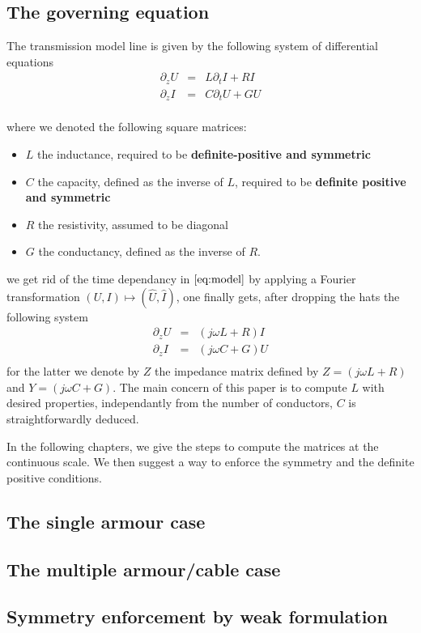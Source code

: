 \subsection*{The governing equation}
The transmission model line is given by the following system of differential equations
\begin{equation}
  \label{eq:model}
    \begin{array}{ccc}
      \partial_z U&=& L\partial_t I + RI \\
      \partial_z I&=& C\partial_t U + GU \\
    \end{array}
\end{equation}

where we denoted the following square matrices:
\begin{itemize}
\item  $L$ the inductance, required to be \textbf{definite-positive and symmetric}
\item $C$ the capacity, defined as the inverse of $L$, required to be \textbf{definite positive and symmetric}
\item $R$ the resistivity, assumed to be diagonal
\item $G$ the conductancy, defined as the inverse of $R$.
\end{itemize}

we get rid  of the time dependancy in $\eqref{eq:model}$ by applying a Fourier transformation $(U,I) \mapsto (\hat{U},\hat{I})$, one finally gets, after dropping the hats the following system
\begin{equation}
  \label{eq:model.fourier}
    \begin{array}{ccc}
      \partial_z U &=& (j\omega L + R) I \\
      \partial_z I &=& (j\omega C  + G) U \\  
    \end{array}
\end{equation}
for the latter we denote by $Z$ the impedance matrix defined by $Z=(j\omega L + R)$ and $Y=(j\omega C  + G)$. The main concern of this paper is to compute $L$ with desired properties, independantly  from the number of conductors, $C$ is straightforwardly deduced.

In the following chapters, we give the steps to compute the matrices at the continuous scale. We then suggest a way to enforce the symmetry and the definite positive conditions.
\subsection*{The single armour case}

\subsection*{The multiple armour/cable case}

\subsection*{Symmetry enforcement by weak formulation}


